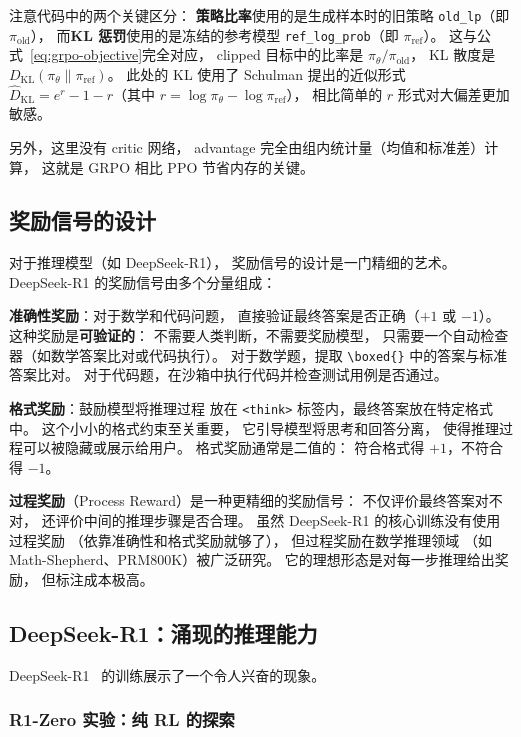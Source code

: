 注意代码中的两个关键区分：
\textbf{策略比率}使用的是生成样本时的旧策略 \texttt{old\_lp}（即 $\pi_{\text{old}}$），
而\textbf{KL 惩罚}使用的是冻结的参考模型 \texttt{ref\_log\_prob}（即 $\pi_{\text{ref}}$）。
这与公式~\eqref{eq:grpo-objective}完全对应，
clipped 目标中的比率是 $\pi_\theta / \pi_{\text{old}}$，
KL 散度是 $D_{\text{KL}}(\pi_\theta \| \pi_{\text{ref}})$。
此处的 KL 使用了 Schulman 提出的近似形式
$\hat{D}_{\text{KL}} = e^{r} - 1 - r$（其中 $r = \log \pi_\theta - \log \pi_{\text{ref}}$），
相比简单的 $r$ 形式对大偏差更加敏感。

另外，这里没有 critic 网络，
advantage 完全由组内统计量（均值和标准差）计算，
这就是 GRPO 相比 PPO 节省内存的关键。

\subsection{奖励信号的设计}

对于推理模型（如 DeepSeek-R1），
奖励信号的设计是一门精细的艺术。
DeepSeek-R1 的奖励信号由多个分量组成：

\textbf{准确性奖励}：对于数学和代码问题，
直接验证最终答案是否正确（$+1$ 或 $-1$）。
这种奖励是\textbf{可验证的}：
不需要人类判断，不需要奖励模型，
只需要一个自动检查器（如数学答案比对或代码执行）。
对于数学题，提取 \texttt{\textbackslash boxed\{\}} 中的答案与标准答案比对。
对于代码题，在沙箱中执行代码并检查测试用例是否通过。

\textbf{格式奖励}：鼓励模型将推理过程
放在 \texttt{<think>} 标签内，最终答案放在特定格式中。
这个小小的格式约束至关重要，
它引导模型将思考和回答分离，
使得推理过程可以被隐藏或展示给用户。
格式奖励通常是二值的：
符合格式得 $+1$，不符合得 $-1$。

\textbf{过程奖励}（Process Reward）是一种更精细的奖励信号：
不仅评价最终答案对不对，
还评价中间的推理步骤是否合理。
虽然 DeepSeek-R1 的核心训练没有使用过程奖励
（依靠准确性和格式奖励就够了），
但过程奖励在数学推理领域
（如 Math-Shepherd、PRM800K）被广泛研究。
它的理想形态是对每一步推理给出奖励，
但标注成本极高。

\subsection{DeepSeek-R1：涌现的推理能力}

DeepSeek-R1~\cite{deepseekr1} 的训练展示了一个令人兴奋的现象。

\subsubsection{R1-Zero 实验：纯 RL 的探索}

